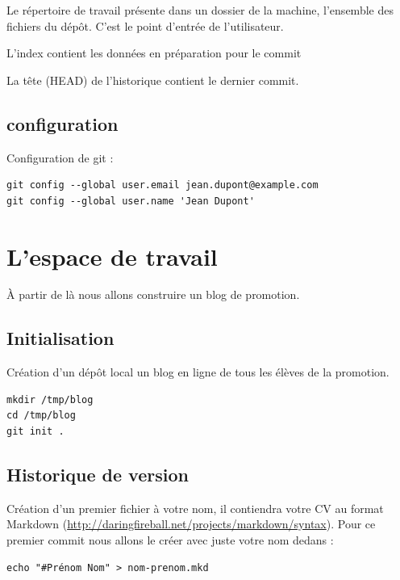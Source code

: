 \documentclass[a4paper]{article}
\begin{document}
Le répertoire de travail présente dans un dossier de la machine, l'ensemble des fichiers du dépôt. C'est le point d'entrée de l'utilisateur.

L'index contient les données en préparation pour le commit

La tête (HEAD) de l'historique contient le dernier commit.


\subsection*{configuration}

Configuration de git :

\begin{verbatim}
git config --global user.email jean.dupont@example.com 
git config --global user.name 'Jean Dupont'
\end{verbatim}

\section*{L'espace de travail}

À partir de là nous allons construire un blog de promotion.

\subsection*{Initialisation}
Création d'un dépôt local
un blog en ligne de tous les élèves de la promotion. \begin{verbatim}
mkdir /tmp/blog
cd /tmp/blog
git init .
\end{verbatim}

\subsection*{Historique de version}
Création d'un premier fichier à votre nom, il contiendra votre CV au format Markdown (\url{http://daringfireball.net/projects/markdown/syntax}).
Pour ce premier commit nous allons le créer avec juste votre nom dedans :
\begin{verbatim}
echo "#Prénom Nom" > nom-prenom.mkd
\end{verbatim}
\end{document}
